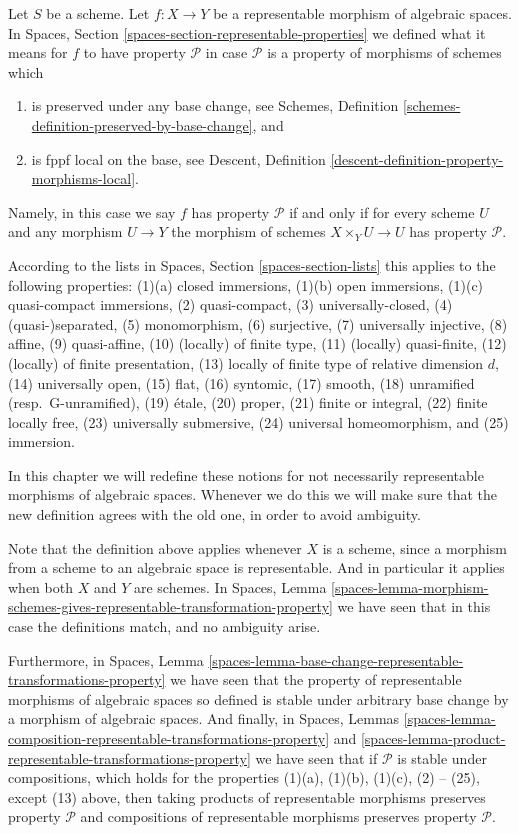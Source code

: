 \noindent
Let $S$ be a scheme.
Let $f : X \to Y$ be a representable morphism of algebraic spaces. In
Spaces, Section \ref{spaces-section-representable-properties}
we defined what it means for $f$ to
have property $\mathcal{P}$ in case $\mathcal{P}$ is a property
of morphisms of schemes which
\begin{enumerate}
\item is preserved under any base change,
see Schemes, Definition \ref{schemes-definition-preserved-by-base-change},
and
\item is fppf local on the base, see
Descent, Definition \ref{descent-definition-property-morphisms-local}.
\end{enumerate}
Namely, in this case we say $f$ has property $\mathcal{P}$ if and only
if for every scheme $U$ and any morphism $U \to Y$ the morphism of schemes
$X \times_Y U \to U$ has property $\mathcal{P}$.

\medskip\noindent
According to the lists in
Spaces, Section \ref{spaces-section-lists}
this applies to the following properties:
(1)(a) closed immersions,
(1)(b) open immersions,
(1)(c) quasi-compact immersions,
(2) quasi-compact,
(3) universally-closed,
(4) (quasi-)separated,
(5) monomorphism,
(6) surjective,
(7) universally injective,
(8) affine,
(9) quasi-affine,
(10) (locally) of finite type,
(11) (locally) quasi-finite,
(12) (locally) of finite presentation,
(13) locally of finite type of relative dimension $d$,
(14) universally open,
(15) flat,
(16) syntomic,
(17) smooth,
(18) unramified (resp.\ G-unramified),
(19) \'etale,
(20) proper,
(21) finite or integral,
(22) finite locally free,
(23) universally submersive,
(24) universal homeomorphism, and
(25) immersion.

\medskip\noindent
In this chapter we will redefine these notions for not necessarily
representable morphisms of algebraic spaces. Whenever we do this we will make
sure that the new definition agrees with the old one, in order to avoid
ambiguity.

\medskip\noindent
Note that the definition above applies whenever $X$ is a scheme,
since a morphism from a scheme to an algebraic space is representable.
And in particular it applies when both $X$ and $Y$ are schemes.
In
Spaces, Lemma
\ref{spaces-lemma-morphism-schemes-gives-representable-transformation-property}
we have seen that in this case the definitions
match, and no ambiguity arise.

\medskip\noindent
Furthermore, in
Spaces, Lemma
\ref{spaces-lemma-base-change-representable-transformations-property}
we have seen that the property of
representable morphisms of algebraic spaces so defined is stable under
arbitrary base change by a morphism of algebraic spaces.
And finally, in
Spaces, Lemmas
\ref{spaces-lemma-composition-representable-transformations-property} and
\ref{spaces-lemma-product-representable-transformations-property}
we have seen that if $\mathcal{P}$ is stable under compositions,
which holds for the properties
(1)(a), (1)(b), (1)(c), (2) -- (25), except (13) above, then
taking products of representable morphisms preserves property $\mathcal{P}$
and compositions of representable morphisms preserves property $\mathcal{P}$.

